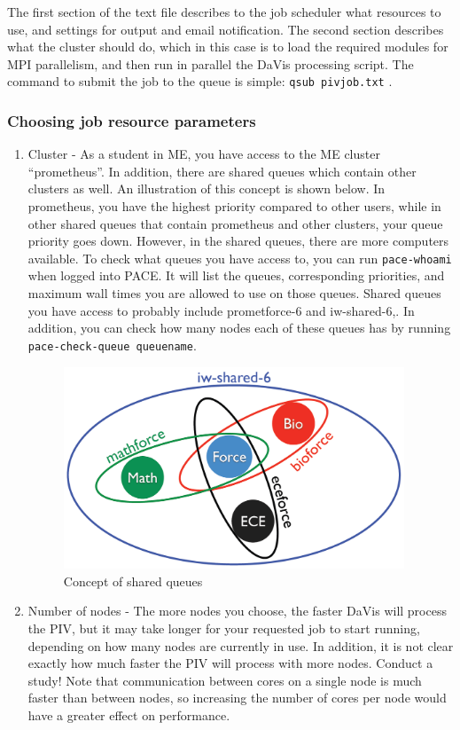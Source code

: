 \documentclass{article}
\newcommand{\quotes}[1]{``#1''}
\begin{document}
	
	The first section of the text file describes to the job scheduler what resources to use, and settings for output and email notification.  The second section describes what the cluster should do, which in this case is to load the required modules for MPI parallelism, and then run in parallel the DaVis processing script.  The command to submit the job to the queue is simple: \texttt{qsub pivjob.txt} .
	
	\subsubsection{Choosing job resource parameters}
	\label{jobresources}
	\begin{enumerate}
		\item Cluster - As a student in ME, you have access to the ME cluster \quotes{prometheus}.  In addition, there are shared queues which contain other clusters as well.  An illustration of this concept is shown below.  In prometheus, you have the highest priority compared to other users, while in other shared queues that contain prometheus and other clusters, your queue priority goes down.  However, in the shared queues, there are more computers available.  To check what queues you have access to, you can run \texttt{pace-whoami} when logged into PACE.  It will list the queues, corresponding priorities, and maximum wall times you are allowed to use on those queues.  Shared queues you have access to probably include prometforce-6 and iw-shared-6,.  In addition, you can check how many nodes each of these queues has by running \texttt{pace-check-queue queuename}.
		\begin{figure}[h!]
			\centering
			\includegraphics[width=4in]{./clusters.png} 
			\caption{Concept of shared queues}
		\end{figure}
	
		\item Number of nodes - The more nodes you choose, the faster DaVis will process the PIV, but it may take longer for your requested job to start running, depending on how many nodes are currently in use.  In addition, it is not clear exactly how much faster the PIV will process with more nodes.  Conduct a study!  Note that communication between cores on a single node is much faster than between nodes, so increasing the number of cores per node would have a greater effect on performance.
		

\end{enumerate}
\end{document}
